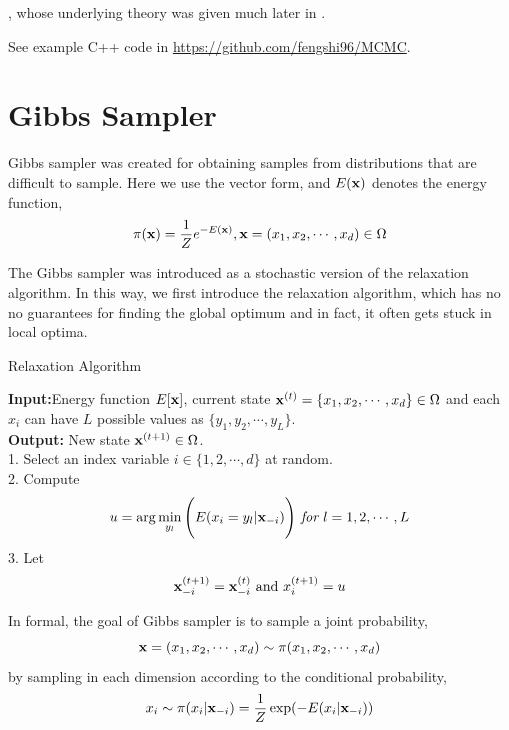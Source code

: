 \documentclass{article}
\begin{document}
\cite{MetropolisPhys}, 
whose underlying theory was given much later in \cite{Hastings}. 

See example C++ code in \href{https://github.com/fengshi96/MCMC}{https://github.com/fengshi96/MCMC}.




















\section{Gibbs Sampler}
Gibbs sampler was created for obtaining samples from distributions that are difficult to sample. Here we use the vector form, and $E(\mathbf{x})$ denotes the energy function,
\[\pi(\mathbf{x})=\frac{1}{Z}e^{-E(\mathbf{x})},\mathbf{x}=(x_1,x_2,\cdots,x_d)\in\Omega\]

The Gibbs sampler was introduced as a stochastic version of the relaxation algorithm. In this way, we first introduce the relaxation algorithm, which has no no guarantees for finding the global optimum and in fact, it often gets stuck in local optima.
\begin{algorithm}
\caption{Relaxation Algorithm}
\label{algo:relaxation}
    \textbf{Input:}Energy function $E[\mathbf{x}]$, current state $\mathbf{x}^{(t)}=\{x_1,x_2,\cdots,x_d\}\in\Omega$ and each $x_i$ can have $L$ possible values as $\{y_1,y_2,\cdots,y_L\}$.\\
    \textbf{Output:} New state $\mathbf{x}^{(t+1)}\in\Omega$.\\
    1. Select an index variable $i\in\{1,2,\cdots,d\}$ at random.\\
    2. Compute 
    \[u=\arg\min_{y_l}\Bigg(E(x_i=y_l|\mathbf{x}_{-i})\Bigg)\textit{ for }l=1,2,\cdots,L\]
    3. Let
    \[\mathbf{x}^{(t+1)}_{-i}=\mathbf{x}^{(t)}_{-i} \text{ and } x^{(t+1)}_{i}=u\]
\end{algorithm}


In formal, the goal of Gibbs sampler is to sample a joint probability,
\[\mathbf{x}=(x_1,x_2,\cdots,x_d)\sim \pi(x_1,x_2,\cdots,x_d)\]
by sampling in each dimension according to the conditional probability,
\[x_i\sim\pi(x_i|\mathbf{x}_{-i})=\frac{1}{Z}\exp(-E(x_i|\mathbf{x}_{-i}))\]
\end{document}
